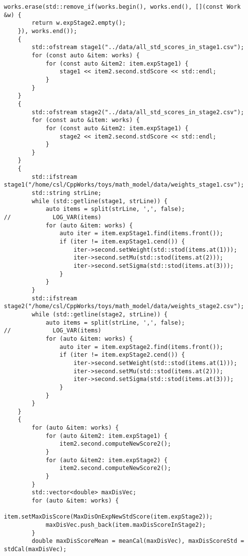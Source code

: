 \documentclass[bwprint]{gmcmthesis}
\begin{document}
\begin{lstlisting}[label=问题2,caption={问题2代码}]
    works.erase(std::remove_if(works.begin(), works.end(), [](const Work &w) {
        return w.expStage2.empty();
    }), works.end());
    {
        std::ofstream stage1("../data/all_std_scores_in_stage1.csv");
        for (const auto &item: works) {
            for (const auto &item2: item.expStage1) {
                stage1 << item2.second.stdScore << std::endl;
            }
        }
    }
    {
        std::ofstream stage2("../data/all_std_scores_in_stage2.csv");
        for (const auto &item: works) {
            for (const auto &item2: item.expStage1) {
                stage2 << item2.second.stdScore << std::endl;
            }
        }
    }
    {
        std::ifstream stage1("/home/csl/CppWorks/toys/math_model/data/weights_stage1.csv");
        std::string strLine;
        while (std::getline(stage1, strLine)) {
            auto items = split(strLine, ',', false);
//            LOG_VAR(items)
            for (auto &item: works) {
                auto iter = item.expStage1.find(items.front());
                if (iter != item.expStage1.cend()) {
                    iter->second.setWeight(std::stod(items.at(1)));
                    iter->second.setMu(std::stod(items.at(2)));
                    iter->second.setSigma(std::stod(items.at(3)));
                }
            }
        }
        std::ifstream stage2("/home/csl/CppWorks/toys/math_model/data/weights_stage2.csv");
        while (std::getline(stage2, strLine)) {
            auto items = split(strLine, ',', false);
//            LOG_VAR(items)
            for (auto &item: works) {
                auto iter = item.expStage2.find(items.front());
                if (iter != item.expStage2.cend()) {
                    iter->second.setWeight(std::stod(items.at(1)));
                    iter->second.setMu(std::stod(items.at(2)));
                    iter->second.setSigma(std::stod(items.at(3)));
                }
            }
        }
    }
    {
        for (auto &item: works) {
            for (auto &item2: item.expStage1) {
                item2.second.computeNewScore2();
            }
            for (auto &item2: item.expStage2) {
                item2.second.computeNewScore2();
            }
        }
        std::vector<double> maxDisVec;
        for (auto &item: works) {
            item.setMaxDisScore(MaxDisOnExpNewStdScore(item.expStage2));
            maxDisVec.push_back(item.maxDisScoreInStage2);
        }
        double maxDisScoreMean = meanCal(maxDisVec), maxDisScoreStd = stdCal(maxDisVec);

\end{lstlisting}
\end{document}

